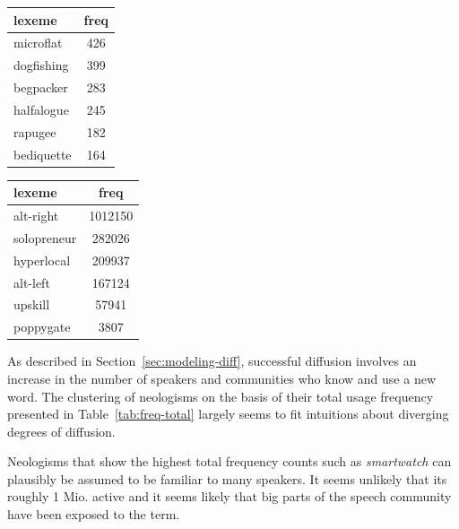 \documentclass[
  a4paper,
  abstract=on,
  captions=tableabove
  ]{scrartcl}
\begin{document}
\begin{table}
    \begin{subtable}{.45\linewidth}
      \label{subtab:freq-total-min}
      \centering
      \begin{tabular}{l S[table-format=3]}
        \toprule
        lexeme               & {freq} \\
        \midrule
        microflat            & 426    \\
        dogfishing           & 399    \\
        begpacker            & 283    \\
        halfalogue           & 245    \\
        rapugee              & 182    \\
        bediquette           & 164    \\
        \bottomrule
      \end{tabular}
    \end{subtable}
    \hfill
    \begin{subtable}{.45\linewidth}
      \label{subtab:freq-total-cases}
      \centering
      \begin{tabular}{l S[table-format=7]}
        \toprule
        lexeme       & {freq}  \\
        \midrule
        alt-right    & 1012150 \\
        solopreneur  & 282026  \\
        hyperlocal   & 209937  \\
        alt-left     & 167124  \\
        upskill      & 57941   \\
        poppygate    & 3807    \\
        \bottomrule
      \end{tabular}
    \end{subtable}
  \end{table}

  As described in Section~\ref{sec:modeling-diff}, successful diffusion involves an increase in the number of speakers and communities who know and use a new word. The clustering of neologisms on the basis of their total usage frequency presented in Table~\ref{tab:freq-total} largely seems to fit intuitions about diverging degrees of diffusion.

  Neologisms that show the highest total frequency counts such as \emph{smartwatch} can plausibly be assumed to be familiar to many speakers. It seems unlikely that its roughly 1 Mio. active  and it seems likely that big parts of the speech community have been exposed to the term.
\end{document}
